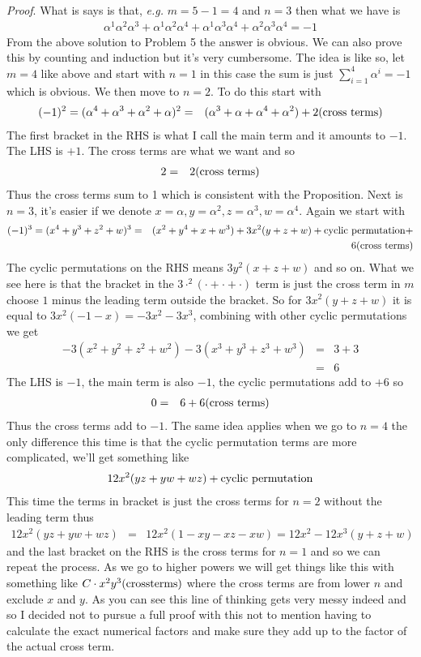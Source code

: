 \documentclass[aps,preprint,preprintnumbers,nofootinbib,showpacs,prd]{revtex4-1}
\newcommand{\eg}{{\it e.g.} }
\newcommand{\nbea}{\begin{eqnarray*}}
\newcommand{\neea}{\end{eqnarray*}}
\begin{document}
{\it Proof}. What is says is that, \eg $m=5 - 1 = 4$ and $n = 3$ then what we have is
%
\nbea
\alpha^{1}\alpha^{2}\alpha^{3} + \alpha^{1}\alpha^{2}\alpha^{4} + \alpha^{1}\alpha^{3}\alpha^{4} + \alpha^{2}\alpha^{3}\alpha^{4} = -1
\neea
%
From the above solution to Problem 5 the answer is obvious. We can also prove this by counting and induction but it's very cumbersome. The idea is like so, let $m = 4$ like above and start with $n = 1$ in this case the sum is just $\sum_{i=1}^{4} \alpha^i = -1$ which is obvious. We then move to $n = 2$. To do this start with
%
\nbea
(-1)^2 = (\alpha^4 + \alpha^3 + \alpha^2 + \alpha)^2 & = & (\alpha^3 + \alpha + \alpha^4 + \alpha^2) + 2({\rm cross~terms})
\neea
%
The first bracket in the RHS is what I call the main term and it amounts to $-1$. The LHS is $+1$. The cross terms are what we want and so
%
\nbea
2 & = & 2 ({\rm cross~terms})
\neea
%
Thus the cross terms sum to 1 which is consistent with the Proposition. Next is $n = 3$, it's easier if we denote $x = \alpha, y = \alpha^2, z = \alpha^3, w = \alpha^4$. Again we start with
%
\nbea
(-1)^3 = (x^4 + y^3 + z^2 + w)^3 & = & (x^2 + y^4 + x + w^3) + 3x^2(y + z + w) + {\rm cyclic~permutation} + \\
&& 6({\rm cross~terms})
\neea
%
The cyclic permutations on the RHS means $3y^2(x + z + w)$ and so on. What we see here is that the bracket in the $3\cdot^2(\cdot + \cdot + \cdot)$ term is just the cross term in $m$ choose $1$ minus the leading term outside the bracket. So for $3x^2(y + z + w)$ it is equal to $3x^2(-1 - x) = -3x^2 - 3x^3$, combining with other cyclic permutations we get
%
\nbea
-3(x^2 + y^2 + z^2 + w^2) - 3(x^3 + y^3 + z^3 + w^3) & = & 3 + 3 \\
& = & 6
\neea
%
The LHS is $-1$, the main term is also $-1$, the cyclic permutations add to $+6$ so 
%
\nbea
0 & = & 6 + 6({\rm cross ~ terms})
\neea
%
Thus the cross terms add to $-1$. The same idea applies when we go to $n = 4$ the only difference this time is that the cyclic permutation terms are more complicated, we'll get something like
%
\nbea
12 x^2 (yz + yw + wz) + {\rm cyclic ~ permutation}
\neea
%
This time the terms in bracket is just the cross terms for $n = 2$ without the leading term thus
%
\nbea
12 x^2 (yz + yw + wz) & = & 12 x^2 (1 - xy - xz - xw) = 12x^2 - 12x^3 (y + z + w)
\neea
%
and the last bracket on the RHS is the cross terms for $n = 1$ and so we can repeat the process. As we go to higher powers we will get things like this with something like $C\cdot x^2 y^3 ({\rm cross terms})$ where the cross terms are from lower $n$ and exclude $x$ and $y$. As you can see this line of thinking gets very messy indeed and so I decided not to pursue a full proof with this not to mention having to calculate the exact numerical factors and make sure they add up to the factor of the actual cross term.
\end{document}

